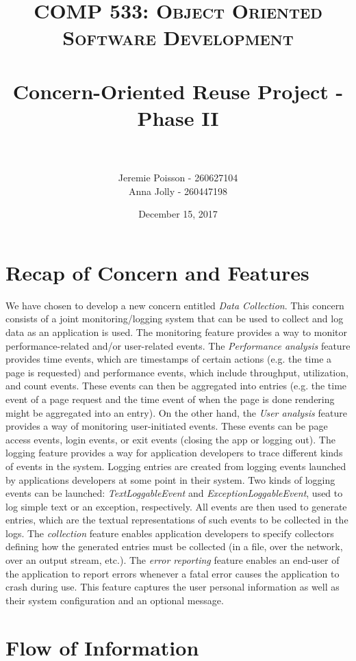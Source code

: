 \documentclass[paper=letter, fontsize=12pt]{scrartcl} %
\title{	
\normalfont \normalsize 
\textsc{COMP 533: Object Oriented Software Development} \\ [25pt] %
\horrule{0.5pt} \\[0.4cm] %
\huge Concern-Oriented Reuse Project - Phase II\\ %
\horrule{2pt} \\[0.5cm] %
}
\author{Jeremie Poisson - 260627104 \\ Anna Jolly - 260447198} %
\date{\normalsize December 15, 2017} %
\numberwithin{equation}{section} %
\numberwithin{figure}{section} %
\numberwithin{table}{section} %
\begin{document}
\maketitle %

\section{Recap of Concern and Features}

We have chosen to develop a new concern entitled \textit{Data Collection}. This concern consists of a joint monitoring/logging system that can be used to collect and log data as an application is used. The monitoring feature provides a way to monitor performance-related and/or user-related events. The \textit{Performance analysis} feature provides time events, which are timestamps of certain actions (e.g. the time a page is requested) and performance events, which include throughput, utilization, and count events. These events can then be aggregated into entries (e.g. the time event of a page request and the time event of when the page is done rendering might be aggregated into an entry). On the other hand, the \textit{User analysis} feature provides a way of monitoring user-initiated events. These events can be page access events, login events, or exit events (closing the app or logging out). The logging feature provides a way for application developers to trace different kinds of events in the system. Logging entries are created from logging events launched by applications developers at some point in their system. Two kinds of logging events can be launched: \textit{TextLoggableEvent} and \textit{ExceptionLoggableEvent}, used to log simple text or an exception, respectively. All events are then used to generate entries, which are the textual representations of such events to be collected in the logs. The \textit{collection} feature enables application developers to specify collectors defining how the generated entries must be collected (in a file, over the network, over an output stream, etc.). The \textit{error reporting} feature enables an end-user of the application to report errors whenever a fatal error causes the application to crash during use. This feature captures the user personal information as well as their system configuration and an optional message.

\section{Flow of Information}
\end{document}
